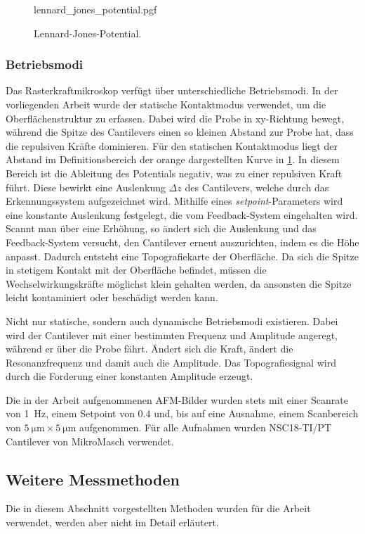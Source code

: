 \begin{figure}
    \centering
    {lennard_jones_potential.pgf}
    \caption{Lennard-Jones-Potential.}
    \label{fig:lennard_jones}
\end{figure}

\subsubsection{Betriebsmodi}
Das Rasterkraftmikroskop verfügt über unterschiedliche Betriebsmodi.
In der vorliegenden Arbeit wurde der statische Kontaktmodus verwendet, um die Oberflächenstruktur zu erfassen.
Dabei wird die Probe in $\mathrm{xy}$-Richtung bewegt, während die Spitze des Cantilevers einen so kleinen Abstand zur
Probe hat, dass die repulsiven Kräfte dominieren.
Für den statischen Kontaktmodus liegt der Abstand im Definitionsbereich der orange dargestellten Kurve in
\cref{fig:lennard_jones}.
In diesem Bereich ist die Ableitung des Potentials negativ, was zu einer repulsiven Kraft führt.
Diese bewirkt eine Auslenkung $\Delta z$ des Cantilevers, welche durch das Erkennungssystem aufgezeichnet wird.
Mithilfe eines \textit{setpoint}-Parameters wird eine konstante Auslenkung festgelegt, die vom Feedback-System
eingehalten wird.
Scannt man über eine Erhöhung, so ändert sich die Auslenkung und das Feedback-System versucht, den Cantilever erneut
auszurichten, indem es die Höhe anpasst.
Dadurch entsteht eine Topografiekarte der Oberfläche.
Da sich die Spitze in stetigem Kontakt mit der Oberfläche befindet, müssen die Wechselwirkungskräfte
möglichst klein gehalten werden, da ansonsten die Spitze leicht kontaminiert oder beschädigt werden kann.

Nicht nur statische, sondern auch dynamische Betriebsmodi existieren.
Dabei wird der Cantilever mit einer bestimmten Frequenz und Amplitude angeregt, während er über die Probe fährt.
Ändert sich die Kraft, ändert die Resonanzfrequenz und damit auch die Amplitude.
Das Topografiesignal wird durch die Forderung einer konstanten Amplitude erzeugt.

Die in der Arbeit aufgenommenen AFM-Bilder wurden stets mit einer Scanrate von \qty{1}{\hertz}, einem
Setpoint von \num{0.4} und, bis auf eine Ausnahme, einem Scanbereich von $\qty{5}{\micro\meter} \times
\qty{5}{\micro\meter}$ aufgenommen.
Für alle Aufnahmen wurden NSC18-TI/PT Cantilever von MikroMasch verwendet.

\subsection{Weitere Messmethoden}\label{subsec:weitere-messmethoden}
Die in diesem Abschnitt vorgestellten Methoden wurden für die Arbeit verwendet, werden aber
nicht im Detail erläutert.

